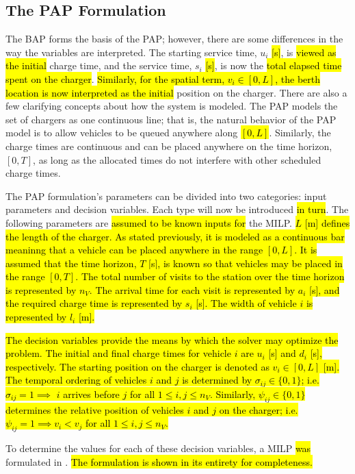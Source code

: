 \documentclass[utf8]{FrontiersinHarvard}
\let\cite\citep                                       %
\begin{document}
\subsection{The PAP Formulation}
\label{sec:the-pap-formulation}
The BAP forms the basis of the PAP; however, there are some differences in the way the variables are interpreted. The
starting service time, \(u_i\) \hl{[s]}, is \hl{viewed as the initial} charge time, and the service
time, \(s_i\) \hl{[s]}, is now the \hl{total elapsed time spent on the charger}.
\hl{Similarly, for the spatial term, $v_i \in [0,L]$, the berth location is now interpreted as the initial}
position on the charger. There are also a few clarifying concepts about how the system is modeled. The PAP models the
set of chargers as one continuous line; that is, the natural behavior of the PAP model is to allow vehicles to be queued
anywhere along \hl{$[0,L]$}. Similarly, the charge times are continuous and can be placed anywhere on the time horizon,
\([0,T]\), as long as the allocated times do not interfere with other scheduled charge times.

The PAP formulation's parameters can be divided into two categories: input parameters and decision variables. Each type
will now be introduced \hl{in turn}. The following parameters are \hl{assumed to be known inputs for} the MILP. \hl{$L$ [m] defines the length of the charger. As stated previously, it is modeled as a continuous bar meaninng that a vehicle can be placed anywhere in the range $[0,L]$. It is assumed that the time horizon, $T$ [s], is known so that vehicles may be placed in the range $[0,T]$. The total number of visits to the station over the time horizon is represented by $n_V$. The arrival time for each visit is represented by $a_i$ [s], and the required charge time is represented by $s_i$ [s]. The width of vehicle $i$ is represented by $l_i$ [m].}

\hl{The decision variables provide the means by which the solver may optimize the problem. The initial and final charge times for vehicle $i$ are $u_i$ [s] and $d_i$ [s], respectively. The starting position on the charger is denoted as $v_i \in [0,L]$ [m]. The temporal ordering of vehicles $i$ and $j$ is determined by $\sigma_{ij} \in \{0, 1\}$; i.e. $\sigma_{ij} = 1 \implies$ $i$ arrives before $j$ for all $1 \le i,j \le n_V$. Similarly, $\psi_{ij} \in \{0, 1\}$ determines the relative position of vehicles $i$ and $j$ on the charger; i.e. $\psi_{ij} = 1 \implies v_i < v_j$ for all $1 \le i,j \le n_V$.}

To determine the values for each of these decision variables, a MILP \hl{was} formulated in
\cite{qarebagh-2019-optim-sched}. \hl{The formulation is shown in its entirety for completeness.}
\end{document}
